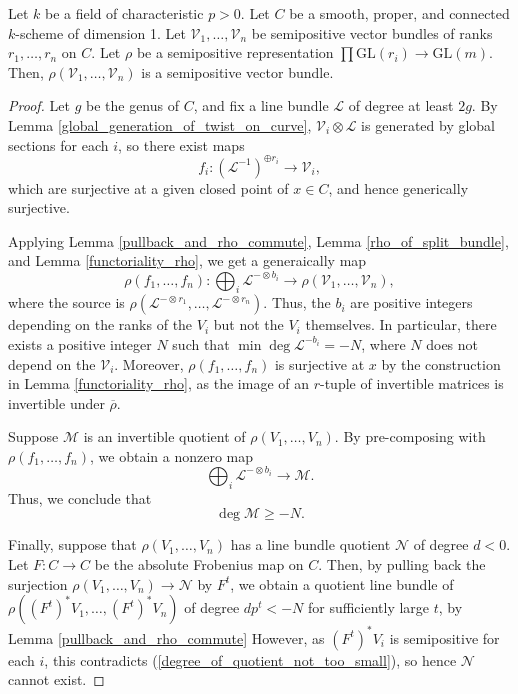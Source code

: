 \begin{lemma}\label{no_negative_quotient_on_curve_p}
Let $k$ be a field of characteristic $p>0$.
Let $C$ be a smooth, proper, and connected $k$-scheme of dimension 1.
Let $\mathcal{V}_1,\ldots,\mathcal{V}_n$ be semipositive vector bundles of ranks $r_1,\ldots,r_n$ on $C$.
Let $\rho$ be a semipositive representation $\prod \mathrm{GL}(r_i)\to \mathrm{GL}(m)$.
Then, $\rho(\mathcal{V}_1,\ldots,\mathcal{V}_n)$ is a semipositive vector bundle.
\end{lemma}
\begin{proof}
Let $g$ be the genus of $C$, and fix a line bundle $\mathcal{L}$ of degree at least $2g$.
By Lemma \ref{global_generation_of_twist_on_curve}, $\mathcal{V}_i\otimes\mathcal{L}$ is generated by global sections for each $i$, so there exist maps
\begin{equation}
f_i:(\mathcal{L}^{-1})^{\oplus r_i}\to \mathcal{V}_i,
\end{equation}
which are surjective at a given closed point of $x\in C$, and hence generically surjective.

Applying Lemma \ref{pullback_and_rho_commute}, Lemma \ref{rho_of_split_bundle}, and Lemma \ref{functoriality_rho}, we get a generaically map
\begin{equation}
\rho(f_1,\ldots,f_n):\bigoplus_{i}\mathcal{L}^{-\otimes b_i}\to\rho(\mathcal{V}_1,\ldots,\mathcal{V}_n),
\end{equation}
where the source is $\rho(\mathcal{L}^{-\otimes r_1},\ldots,\mathcal{L}^{-\otimes r_n})$.
Thus, the $b_i$ are positive integers depending on the ranks of the $V_i$ but not the $V_i$ themselves.
In particular, there exists a positive integer $N$ such that $\min\deg\mathcal{L}^{-b_i}=-N$, where $N$ does not depend on the $\mathcal{V}_i$. Moreover, $\rho(f_1,\ldots,f_n)$ is surjective at $x$ by the construction in Lemma \ref{functoriality_rho}, as the image of an $r$-tuple of invertible matrices is invertible under $\overline{\rho}$.

Suppose $\mathcal{M}$ is an invertible quotient of $\rho(V_1,\ldots,V_n)$. By pre-composing with $\rho(f_1,\ldots,f_n)$, we obtain a nonzero map
$$
\bigoplus_{i}\mathcal{L}^{-\otimes b_i}\to\mathcal{M}.
$$
Thus, we conclude that
\begin{equation}\label{degree_of_quotient_not_too_small}
\deg\mathcal{M}\ge -N.
\end{equation}

Finally, suppose that $\rho(V_1,\ldots,V_n)$ has a line bundle quotient $\mathcal{N}$ of degree $d<0$.
Let $F:C\to C$ be the absolute Frobenius map on $C$.
Then, by pulling back the surjection $\rho(V_1,\ldots,V_n)\to\mathcal{N}$ by $F^t$, we obtain a quotient line bundle of $\rho((F^{t})^{*}V_1,\ldots,(F^{t})^{*}V_n)$ of degree $dp^{t}<-N$ for sufficiently large $t$, by Lemma \ref{pullback_and_rho_commute}
However, as $(F^{t})^*V_i$ is semipositive for each $i$, this contradicts (\ref{degree_of_quotient_not_too_small}), so hence $\mathcal{N}$ cannot exist.
\end{proof}

